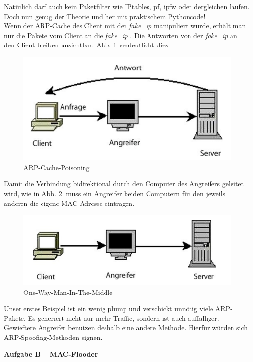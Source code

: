 \documentclass[paper=a4,fontsize=11pt]{scrartcl}%
\numberwithin{equation}{section}
\begin{document}
Natürlich darf auch kein Paketfilter wie IPtables, pf, ipfw oder dergleichen laufen. Doch nun genug der Theorie und her mit praktischem Pythoncode!\\
Wenn der ARP-Cache des Client mit der \emph{fake\_ip} manipuliert wurde, erhält man nur die Pakete vom Client an die \emph{fake\_ip} . Die Antworten von der \emph{fake\_ip} an den Client bleiben unsichtbar. Abb. \ref{apr_poison} verdeutlicht dies.\\
\begin{figure}[H]
\centering
\includegraphics[scale=0.5]{arp_poison}
\caption{ARP-Cache-Poisoning}
\label{apr_poison}
\end{figure}
Damit die Verbindung bidirektional durch den Computer des Angreifers geleitet wird, wie in Abb. \ref{owmitm}, muss ein Angreifer beiden Computern für den jeweils anderen die eigene MAC-Adresse eintragen.\\
\begin{figure}[H]
\centering
\includegraphics[scale=0.5]{one_way_mitm}
\caption{One-Way-Man-In-The-Middle}
\label{owmitm}
\end{figure}
Unser erstes Beispiel ist ein wenig plump und verschickt unnötig viele ARP-Pakete. Es generiert nicht nur mehr Traffic, sondern ist auch auffälliger. Gewieftere Angreifer benutzen deshalb eine andere Methode. Hierfür würden sich ARP-Spoofing-Methoden eignen.
\begin{center}\Large{\textbf{Aufgabe B -- MAC-Flooder}}\end{center}\vskip0.25in
\end{document}
